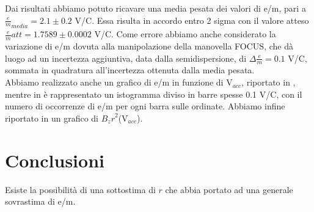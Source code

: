Dai risultati abbiamo potuto ricavare una media pesata dei valori di e/m, pari a $\frac{e}{m}_{media} = 2.1 \pm 0.2$ V/C. Essa risulta in accordo entro 2 sigma con il valore atteso $\frac{e}{m}{att} = 1.7589 \pm 0.0002$ V/C. Come errore abbiamo anche considerato la variazione di e/m dovuta alla manipolazione della manovella FOCUS, che dà luogo ad un incertezza aggiuntiva, data dalla semidispersione, di $\Delta \frac{e}{m} = 0.1$ V/C, sommata in quadratura all'incertezza ottenuta dalla media pesata.\\
Abbiamo realizzato anche un grafico di e/m in funzione di V$_{acc}$, riportato in , mentre in  è rappresentato un istogramma diviso in barre spesse 0.1 V/C, con il numero di occorrenze di e/m per ogni barra sulle ordinate. Abbiamo infine riportato in  un grafico di ${B_z r}^2$(V$_{acc}$).

\section{Conclusioni}
Esiste la possibilità di una sottostima di $r$ che abbia portato ad una generale sovrastima di e/m.